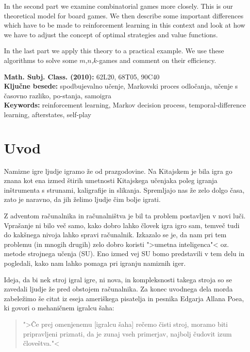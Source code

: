 \documentclass[12pt,a4paper]{amsart}
\theoremstyle{definition} %
\theoremstyle{plain} %
\begin{document}
In the second part we examine combinatorial games more closely. This is our theoretical model for board 
games. We then describe some important differences which have to be made to reinforcement learning in 
this context and look at how we have to adjust the concept of optimal strategies and value functions.

In the last part we apply this theory to a practical example. We use these algorithms to solve some 
$m$,$n$,$k$-games and comment on their efficiency.

\vfill\noindent
{\bf Math. Subj. Class. (2010):} 62L20, 68T05, 90C40  \\[1mm]  %
{\bf Ključne besede:} spodbujevalno učenje, Markovski proces odločanja, učenje s časovno razliko, 
                      po-stanja, samoigra \\[1mm]  
{\bf Keywords:} reinforcement learning, Markov decision process, temporal-difference learning,  
                afterstates, self-play
\pagebreak



\section{Uvod}
Namizne igre ljudje igramo že od prazgodovine. Na Kitajskem je bila igra go znana kot ena 
izmed štirih umetnosti Kitajskega učenjaka poleg igranja inštrumenta s strunami, kaligrafije
in slikanja. Spremljajo nas že zelo dolgo časa, zato je naravno, da jih želimo ljudje čim
bolje igrati.

Z adventom računalnika in računalništva je bil ta problem postavljen v novi luči. Vprašanje
ni bilo več samo, kako dobro lahko človek igra igro sam, temveč tudi do kakšnega nivoja 
lahko spravi računalnik. Izkazalo se je, da nam pri tem problemu (in mnogih drugih) zelo dobro
koristi ">umetna inteligenca"< oz. metode strojnega učenja (SU). Eno izmed vej SU bomo 
predstavili v tem delu in pogledali, kako nam lahko pomaga pri igranju namiznih iger.

Ideja, da bi nek stroj igral igre, ni nova, in kompleksnosti takega stroja so se zavedali ljudje
že pred obstojem računalnika. 
Za konec uvodnega dela morda zabeležimo še citat iz eseja ameriškega pisatelja in pesnika 
Edgarja Allana Poea, ki govori o mehaničnem igralcu šaha: 

\begin{quotation}
    ">Če prej omenjenemu [igralcu šaha] rečemo čisti stroj, moramo biti pripravljeni priznati, da je
    zunaj vseh primerjav, najbolj čudovit izum človeštva."<
\end{quotation}
\end{document}
